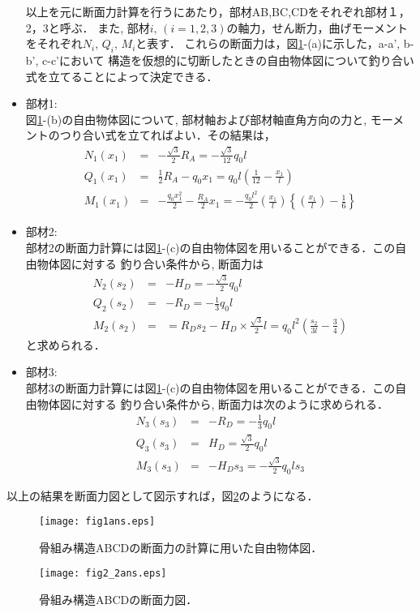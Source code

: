 \documentclass[10pt,a4j]{jarticle}
\begin{document}
\begin{itemize}
	以上を元に断面力計算を行うにあたり，部材AB,BC,CDをそれぞれ部材１，2，3と呼ぶ．
	また, 部材$i,\,(i=1,2,3)$の軸力，せん断力，曲げモーメントをそれぞれ$N_i, \, Q_i,\, M_i$と表す．
	これらの断面力は，図\ref{fig:fig1}-(a)に示した，a-a', b-b', c-c'において
	構造を仮想的に切断したときの自由物体図について釣り合い式を立てることによって決定できる．
\item
	{\rm 部材1:} \\
	図\ref{fig:fig1}-(b)の自由物体図について, 部材軸および部材軸直角方向の力と, 
	モーメントのつり合い式を立てればよい．その結果は，
	\begin{eqnarray}
		N_1(x_1) & =& -\frac{\sqrt{3}}{2}R_A=-\frac{\sqrt{3}}{12}q_0l \\
		Q_1(x_1) & =& \frac{1}{2}R_A-q_0x_1=q_0l\left(\frac{1}{12}-\frac{x_1}{l}\right)\\
		M_1(x_1) & =& -\frac{q_0x_1^2}{2}-\frac{R_A}{2}x_1=-\frac{q_0l^2}{2}
		\left(\frac{x_1}{l}\right)
		\left\{
		\left(\frac{x_1}{l}\right)
		-\frac{1}{6}
		\right\}
	\end{eqnarray}
\item
	{\rm 部材2:} \\
	部材2の断面力計算には図\ref{fig:fig1}-(c)の自由物体図を用いることができる．この自由物体図に対する
	釣り合い条件から, 断面力は
	\begin{eqnarray}
		N_2(s_2) 
			&=& 
			-H_D=-\frac{\sqrt{3}}{2}q_0l\\
		Q_2(s_2) 
			&=&
			-R_D=
			-\frac{1}{3}q_0l\\
		M_2(s_2) 
			&=&
			=R_Ds_2-H_D\times \frac{\sqrt{3}}{2}l
			= q_0l^2 \left( \frac{s_2}{3l}-\frac{3}{4}\right)
	\end{eqnarray}
	と求められる．
\item
	{\rm 部材3:} \\
	部材3の断面力計算には図\ref{fig:fig1}-(c)の自由物体図を用いることができる．この自由物体図に対する
	釣り合い条件から, 断面力は次のように求められる．
	\begin{eqnarray}
		N_3(s_3) 
			&=& 
			-R_D=-\frac{1}{3}q_0l\\
		Q_3(s_3) 
			&=&
			H_D=
			\frac{\sqrt{3}}{2}q_0l\\
		M_3(s_3) 
			&=&
			-H_Ds_3
			=-\frac{\sqrt{3}}{2}q_0ls_3
	\end{eqnarray}
\end{itemize}
以上の結果を断面力図として図示すれば，図\ref{fig:fig2}のようになる．
\begin{figure}[h]
	\begin{center}
	\texttt{[image: fig1ans.eps]} 
	\end{center}
	\caption{骨組み構造ABCDの断面力の計算に用いた自由物体図．} 
	\label{fig:fig1}
\end{figure}
\begin{figure}[h]
	\begin{center}
	\texttt{[image: fig2\_2ans.eps]} 
	\end{center}
	\caption{骨組み構造ABCDの断面力図．} 
	\label{fig:fig2}
\end{figure}
\end{document}

